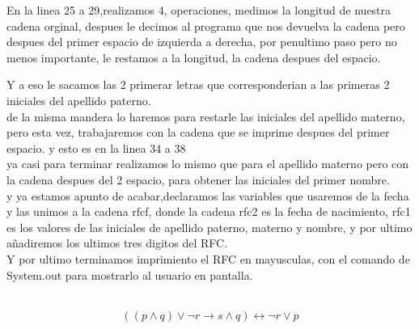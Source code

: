 \documentclass{report}%
\begin{document}
{En la linea 25 a 29,realizamos 4, operaciones, medimos la longitud de nuestra cadena orginal, despues le decimos al programa que nos devuelva la cadena pero despues del primer espacio de izquierda a derecha, por penultimo paso pero no menos importante, le restamos a la longitud, la cadena despues del espacio.

Y a eso le sacamos las 2 primerar letras que corresponderian a las primeras 2 iniciales del apellido paterno.\\


de la misma mandera lo haremos para restarle las iniciales del apellido materno, pero esta vez, trabajaremos con la cadena que se imprime despues del primer espacio. y esto es en la linea 34 a 38\\


ya casi para terminar realizamos lo mismo que para el apellido materno pero con la cadena despues del 2 espacio, para obtener las iniciales del primer nombre.\\



y ya estamos apunto de acabar,declaramos las variables que usaremos de la fecha y las unimos a la cadena rfcf, donde la cadena rfc2 es la fecha de nacimiento, rfc1 es los valores de las iniciales de apellido paterno, materno y nombre, y por ultimo añadiremos los ultimos tres digitos del RFC.\\


Y por ultimo terminamos imprimiento el RFC en mayusculas, con el comando de System.out para mostrarlo al usuario en pantalla.\\




}
\newpage
\thispagestyle{plain}
\\
{\small
$$((p\wedge q)\vee \neg r \rightarrow s \wedge q) \leftrightarrow \neg r \vee p $$
}
\end{document}
